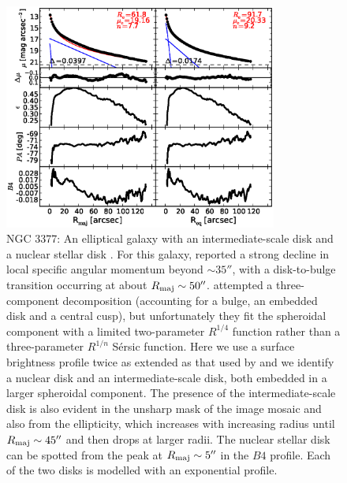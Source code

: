 \documentclass[preprint2]{emulateapj}
\newcommand{\fitfigurewidth}{0.8\textwidth}
\begin{document}
  \begin{figure}[h]
  \begin{center}
  \includegraphics[width=\fitfigurewidth]{images/n3377_1Dfit.eps}
  \caption{NGC 3377: 
  An elliptical galaxy with an intermediate-scale disk and a nuclear stellar disk \citep{ledo2010}. 
  For this galaxy, \citet{arnold2014} reported a strong decline in local specific angular momentum beyond $\sim 35''$, 
  with a disk-to-bulge transition occurring at about $R_{\rm maj} \sim 50''$.
  \citet{arnold2014} attempted a three-component decomposition (accounting for a bulge, an embedded disk and a central cusp), 
  but unfortunately they fit the spheroidal component with a limited two-parameter $R^{1/4}$ function 
  rather than a three-parameter $R^{1/n}$ S\'ersic function.
  Here we use a surface brightness profile twice as extended as that used by \citet{arnold2014} 
  and we identify a nuclear disk and an intermediate-scale disk, both embedded in a larger spheroidal component.
  The presence of the intermediate-scale disk is also evident in the unsharp mask of the image mosaic 
  and also from the ellipticity, which increases with increasing radius until $R_{\rm maj} \sim 45''$ 
  and then drops at larger radii.
  The nuclear stellar disk can be spotted from the peak at $R_{\rm maj} \sim 5''$ in the $B4$ profile.
  Each of the two disks is modelled with an exponential profile. 
  }
  \end{center}
  \end{figure}
  
\end{document}
